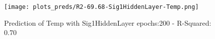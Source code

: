 
\begin{figure}[H]
    \centering
    \texttt{[image: plots\_preds/R2-69.68-Sig1HiddenLayer-Temp.png]}
    \caption{Prediction of Temp with Sig1HiddenLayer epochs:200 - R-Squared: 0.70}
\end{figure}
